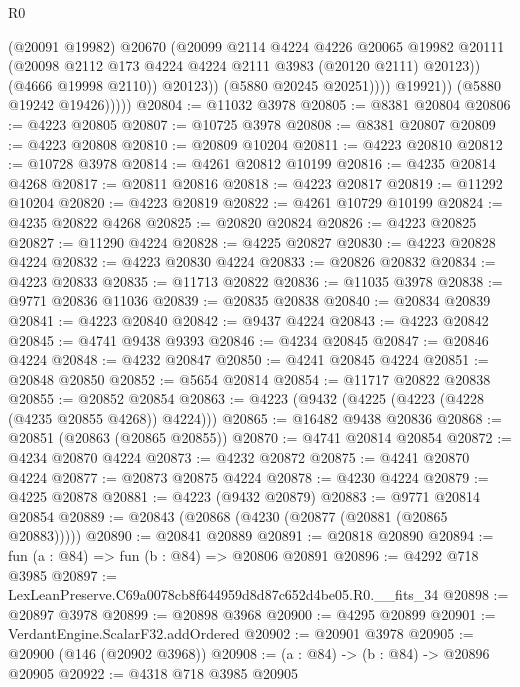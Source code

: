 \begin{lexlean}{R0}
\begin{coremodule}
                            (@20091 @19982)
                            @20670
                            (@20099
                              @2114
                              @4224
                              @4226
                              @20065
                              @19982
                              @20111
                              (@20098 @2112 @173 @4224 @4224 @2111 @3983 (@20120 @2111) @20123))
                            (@4666 @19998 @2110))
                          @20123))
                      (@5880 @20245 @20251))))
                @19921))
            (@5880 @19242 @19426)))))
@20804 := @11032 @3978
@20805 := @8381 @20804
@20806 := @4223 @20805
@20807 := @10725 @3978
@20808 := @8381 @20807
@20809 := @4223 @20808
@20810 := @20809 @10204
@20811 := @4223 @20810
@20812 := @10728 @3978
@20814 := @4261 @20812 @10199
@20816 := @4235 @20814 @4268
@20817 := @20811 @20816
@20818 := @4223 @20817
@20819 := @11292 @10204
@20820 := @4223 @20819
@20822 := @4261 @10729 @10199
@20824 := @4235 @20822 @4268
@20825 := @20820 @20824
@20826 := @4223 @20825
@20827 := @11290 @4224
@20828 := @4225 @20827
@20830 := @4223 @20828 @4224
@20832 := @4223 @20830 @4224
@20833 := @20826 @20832
@20834 := @4223 @20833
@20835 := @11713 @20822
@20836 := @11035 @3978
@20838 := @9771 @20836 @11036
@20839 := @20835 @20838
@20840 := @20834 @20839
@20841 := @4223 @20840
@20842 := @9437 @4224
@20843 := @4223 @20842
@20845 := @4741 @9438 @9393
@20846 := @4234 @20845
@20847 := @20846 @4224
@20848 := @4232 @20847
@20850 := @4241 @20845 @4224
@20851 := @20848 @20850
@20852 := @5654 @20814
@20854 := @11717 @20822 @20838
@20855 := @20852 @20854
@20863 := @4223 (@9432 (@4225 (@4223 (@4228 (@4235 @20855 @4268)) @4224)))
@20865 := @16482 @9438 @20836
@20868 := @20851 (@20863 (@20865 @20855))
@20870 := @4741 @20814 @20854
@20872 := @4234 @20870 @4224
@20873 := @4232 @20872
@20875 := @4241 @20870 @4224
@20877 := @20873 @20875 @4224
@20878 := @4230 @4224
@20879 := @4225 @20878
@20881 := @4223 (@9432 @20879)
@20883 := @9771 @20814 @20854
@20889 := @20843 (@20868 (@4230 (@20877 (@20881 (@20865 @20883)))))
@20890 := @20841 @20889
@20891 := @20818 @20890
@20894 := fun (a : @84) => fun (b : @84) => @20806 @20891
@20896 := @4292 @718 @3985
@20897 := LexLeanPreserve.C69a0078cb8f644959d8d87c652d4be05.R0.__fits_34
@20898 := @20897 @3978
@20899 := @20898 @3968
@20900 := @4295 @20899
@20901 := VerdantEngine.ScalarF32.addOrdered
@20902 := @20901 @3978
@20905 := @20900 (@146 (@20902 @3968))
@20908 := (a : @84) -> (b : @84) -> @20896 @20905
@20922 := @4318
    @718
    @3985
    @20905

\end{coremodule}
\end{lexlean}
